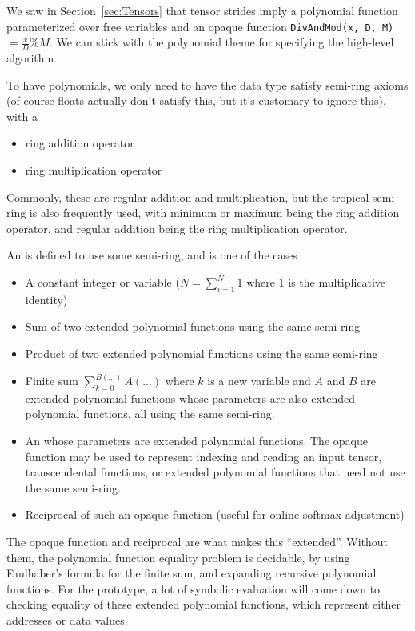 
We saw in Section~\ref{sec:Tensors} that tensor strides imply a polynomial function parameterized over free variables and an opaque function \texttt{DivAndMod(x, D, M)} $= \frac{x}{D} \% M$.
We can stick with the polynomial theme for specifying the high-level algorithm.

To have polynomials, we only need to have the data type satisfy semi-ring axioms (of course floats actually don't satisfy this, but it's customary to ignore this), with a
\begin{itemize}
  \item ring addition operator
  \item ring multiplication operator
\end{itemize}
Commonly, these are regular addition and multiplication, but the tropical semi-ring is also frequently used, with minimum or maximum being the ring addition operator, and regular addition being the ring multiplication operator.

An  is defined to use some semi-ring, and is one of the cases
\begin{itemize}
  \item A constant integer or variable ($N = \sum_{i=1}^N 1$ where $1$ is the multiplicative identity)
  \item Sum of two extended polynomial functions using the same semi-ring
  \item Product of two extended polynomial functions using the same semi-ring
  \item Finite sum $\sum_{k=0}^{B(...)} A(...)$ where $k$ is a new variable and $A$ and $B$ are extended polynomial functions whose parameters are also extended polynomial functions, all using the same semi-ring.
  \item An  whose parameters are extended polynomial functions.
    The opaque function may be used to represent indexing and reading an input tensor, transcendental functions, or extended polynomial functions that need not use the same semi-ring.
  \item Reciprocal of such an opaque function (useful for online softmax adjustment)
\end{itemize}
The opaque function and reciprocal are what makes this ``extended''.
Without them, the polynomial function equality problem is decidable, by using Faulhaber's formula for the finite sum, and expanding recursive polynomial functions.
For the prototype, a lot of symbolic evaluation will come down to checking equality of these extended polynomial functions, which represent either addresses or data values.


